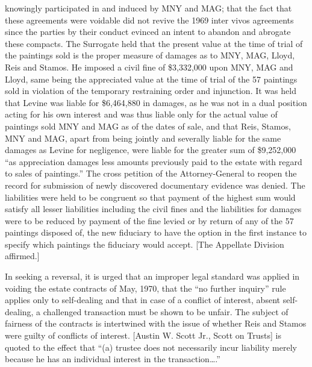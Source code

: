 knowingly participated in and induced by MNY and MAG; that the fact that these
agreements were voidable did not revive the 1969 inter vivos agreements since
the parties by their conduct evinced an intent to abandon and abrogate these
compacts. The Surrogate held that the present value at the time of trial of the
paintings sold is the proper measure of damages as to MNY, MAG, Lloyd, Reis and
Stamos. He imposed a civil fine of \$3,332,000 upon MNY, MAG and Lloyd, same
being the appreciated value at the time of trial of the 57 paintings sold in
violation of the temporary restraining order and injunction. It was held that
Levine was liable for \$6,464,880 in damages, as he was not in a dual position
acting for his own interest and was thus liable only for the actual value of
paintings sold MNY and MAG as of the dates of sale, and that Reis, Stamos, MNY
and MAG, apart from being jointly and severally liable for the same damages as
Levine for negligence, were liable for the greater sum of \$9,252,000 ``as
appreciation damages less amounts previously paid to the estate with regard to
sales of paintings.'' The cross petition of the Attorney-General to reopen the
record for submission of newly discovered documentary evidence was denied. The
liabilities were held to be congruent so that payment of the highest sum would
satisfy all lesser liabilities including the civil fines and the liabilities for
damages were to be reduced by payment of the fine levied or by return of any of
the 57 paintings disposed of, the new fiduciary to have the option in the first
instance to specify which paintings the fiduciary would accept. [The Appellate
Division affirmed.]

In seeking a reversal, it is urged that an improper legal standard was applied
in voiding the estate contracts of May, 1970, that the ``no further inquiry''
rule applies only to self-dealing and that in case of a conflict of interest,
absent self-dealing, a challenged transaction must be shown to be unfair. The
subject of fairness of the contracts is intertwined with the issue of whether
Reis and Stamos were guilty of conflicts of interest. [Austin W. Scott Jr., Scott on Trusts] is
quoted to the effect that ``(a) trustee does not necessarily incur liability
merely because he has an individual interest in the transaction\ldots .''

